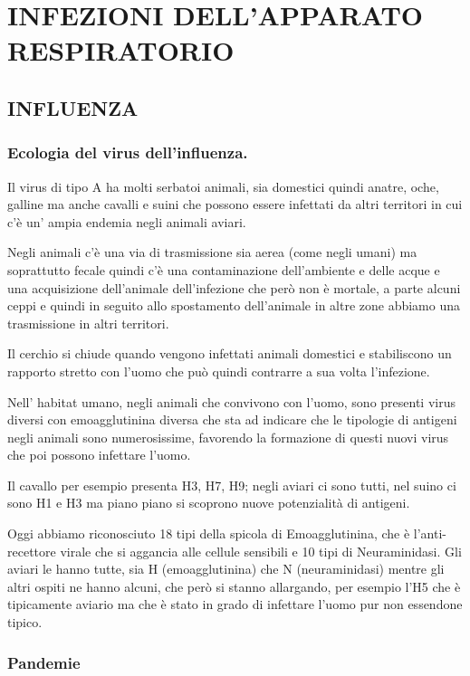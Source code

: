 
\section{INFEZIONI DELL'APPARATO RESPIRATORIO}


\subsection{INFLUENZA}

\subsubsection{Ecologia del virus dell'influenza.}


Il virus di tipo A ha molti serbatoi animali, sia domestici quindi
anatre, oche, galline ma anche cavalli e suini che possono essere
infettati da altri territori in cui c'è un' ampia endemia negli animali
aviari.

Negli animali c'è una via di trasmissione sia aerea (come negli umani)
ma soprattutto fecale quindi c'è una contaminazione dell'ambiente e
delle acque e una acquisizione dell'animale dell'infezione che però non
è mortale, a parte alcuni ceppi e quindi in seguito allo spostamento
dell'animale in altre zone abbiamo una trasmissione in altri territori.

Il cerchio si chiude quando vengono infettati animali domestici e
stabiliscono un rapporto stretto con l'uomo che può quindi contrarre a
sua volta l'infezione.

Nell' habitat umano, negli animali che convivono con l'uomo, sono
presenti virus diversi con emoagglutinina diversa che sta ad indicare
che le tipologie di antigeni negli animali sono numerosissime, favorendo
la formazione di questi nuovi virus che poi possono infettare l'uomo.

Il cavallo per esempio presenta H3, H7, H9; negli aviari ci sono tutti,
nel suino ci sono H1 e H3 ma piano piano si scoprono nuove potenzialità
di antigeni.

Oggi abbiamo riconosciuto 18 tipi della spicola di Emoagglutinina, che è
l'anti-recettore virale che si aggancia alle cellule sensibili e 10 tipi
di Neuraminidasi. Gli aviari le hanno tutte, sia H (emoagglutinina) che
N (neuraminidasi) mentre gli altri ospiti ne hanno alcuni, che però si
stanno allargando, per esempio l'H5 che è tipicamente aviario ma che è
stato in grado di infettare l'uomo pur non essendone tipico.

\subsubsection{Pandemie}


